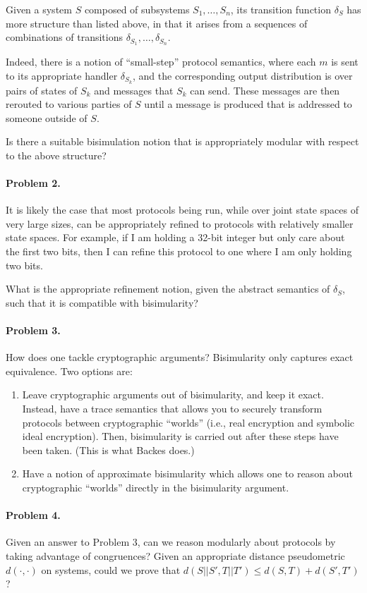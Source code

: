 \documentclass{article}
\begin{document}
Given a system $S$ composed of subsystems $S_1, \dots, S_n$, its transition function $\delta_S$ has more structure than listed above, in that it arises from a sequences of combinations of transitions $\delta_{S_1}, \dots, \delta_{S_n}$. 

Indeed, there is a notion of ``small-step'' protocol semantics, where each $m$ is sent to its appropriate handler $\delta_{S_k}$, and the corresponding output distribution is over pairs of states of $S_k$ and messages that $S_k$ can send. These messages are then rerouted to various parties of $S$ until a message is produced that is addressed to someone outside of $S$.

Is there a suitable bisimulation notion that is appropriately modular with respect to the above structure?

\paragraph{Problem 2.}

It is likely the case that most protocols being run, while over joint state spaces of very large sizes, can be appropriately refined to protocols with relatively smaller state spaces. For example, if I am holding a 32-bit integer but only care about the first two bits, then I can refine this protocol to one where I am only holding two bits. 

What is the appropriate refinement notion, given the abstract semantics of $\delta_S$, such that it is compatible with bisimularity?

\paragraph{Problem 3.}

How does one tackle cryptographic arguments? Bisimularity only captures exact equivalence. Two options are:
\begin{enumerate}
    \item Leave cryptographic arguments out of bisimularity, and keep it exact. Instead, have a trace semantics that allows you to securely transform protocols between cryptographic ``worlds'' (i.e., real encryption and symbolic ideal encryption). Then, bisimularity is carried out after these steps have been taken. (This is what Backes does.)
    \item Have a notion of approximate bisimularity which allows one to reason about cryptographic ``worlds'' directly in the bisimularity argument.
\end{enumerate}

\paragraph{Problem 4.}

Given an answer to Problem 3, can we reason modularly about protocols by taking advantage of congruences? Given an appropriate distance pseudometric $d(\cdot, \cdot)$ on systems, could we prove that $d(S || S', T || T') \leq d(S,T) + d(S', T')$?
\end{document}
